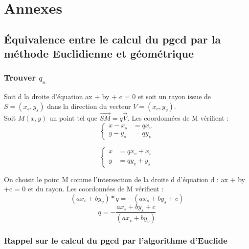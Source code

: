 \section{Annexes}

\subsection{Équivalence entre le calcul du pgcd par la méthode Euclidienne et géométrique}

\subsubsection{Trouver $q_n$}

Soit d la droite d'équation ax + by + c = 0 et soit un rayon issue de $S=(x_s, y_s)$ dans la direction du vecteur $V=(x_v, y_v)$.\\
Soit $M(x,y)$ un point tel que $\overrightarrow{SM} = q \overrightarrow{V}$. Les coordonnées de M vérifient : \\
 
\begin{equation*}
    \left\{
    \begin{split}
      x - x_s &= q x_v \\
      y - y_s &= q y_v 
   \end{split}
   \right. 
\end{equation*}

\begin{equation*}
    \left\{
    \begin{split}
      x &= q x_v + x_s \\
      y &= q y_v + y_s 
   \end{split}
   \right. 
\end{equation*}


On choisit le point M comme l'intersection de la droite d d'équation d : ax + by +c = 0 et du rayon. Les coordonnées de M vérifient : \\

$$(a x_v + b y_v) * q = -(a x_s + b y_s +c)$$
$$q = - \frac{a x_s + b y_s +c}{(a x_v + b y_v)}$$

\subsubsection{Rappel sur le calcul du pgcd par l'algorithme d'Euclide}


